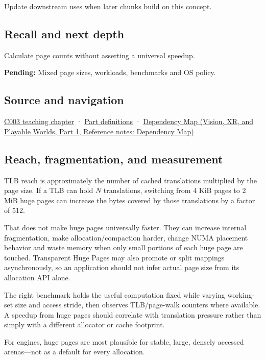 \hypertarget{appendix-ce688d1acdab-used-by}{}

Update downstream uses when later chunks build on this concept.

\subsection{Recall and next depth}\label{appendix-ce688d1acdab-recall-and-next-depth}

\hypertarget{appendix-ce688d1acdab-recall-and-next-depth}{}

Calculate page counts without asserting a universal speedup.

\textbf{Pending:} Mixed page sizes, workloads, benchmarks and OS policy.

\subsection{Source and navigation}\label{appendix-ce688d1acdab-source-and-navigation}

\hypertarget{appendix-ce688d1acdab-source-and-navigation}{}

\hyperref[01-foundations-i-ch002-where-the-bytes-live]{C003 teaching chapter} · \hyperref[appendix-fd090d982a15-m003---parts-41-60]{Part definitions} · \href{../07-Vision-XR-and-Playable-Worlds-P01/main.pdf\#appendix-4ad47bdd269a}{Dependency Map (Vision, XR, and Playable Worlds, Part 1, Reference notes: Dependency Map)}

\subsection{Reach, fragmentation, and measurement}\label{appendix-ce688d1acdab-reach-fragmentation-and-measurement}

\hypertarget{appendix-ce688d1acdab-reach-fragmentation-and-measurement}{}

TLB reach is approximately the number of cached translations multiplied by the page size. If a TLB can hold \(N\) translations, switching from 4 KiB pages to 2 MiB huge pages can increase the bytes covered by those translations by a factor of 512.

That does not make huge pages universally faster. They can increase internal fragmentation, make allocation/compaction harder, change NUMA placement behavior and waste memory when only small portions of each huge page are touched. Transparent Huge Pages may also promote or split mappings asynchronously, so an application should not infer actual page size from its allocation API alone.

The right benchmark holds the useful computation fixed while varying working-set size and access stride, then observes TLB/page-walk counters where available. A speedup from huge pages should correlate with translation pressure rather than simply with a different allocator or cache footprint.

For engines, huge pages are most plausible for stable, large, densely accessed arenas---not as a default for every allocation.
